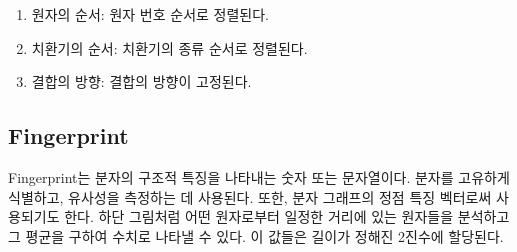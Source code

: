 \documentclass[9pt]{ieeeconf}
\begin{document}
\begin{enumerate}
    \item 원자의 순서: 원자 번호 순서로 정렬된다.
    \item 치환기의 순서: 치환기의 종류 순서로 정렬된다.
    \item 결합의 방향: 결합의 방향이 고정된다.
\end{enumerate}

\subsection[short]{\large {Fingerprint}}
Fingerprint는 분자의 구조적 특징을 나타내는 숫자 또는 문자열이다. 분자를 고유하게 식별하고, 유사성을 측정하는 데 사용된다. 또한, 분자 그래프의 정점 특징 벡터로써 사용되기도 한다. 
하단 그림처럼 어떤 원자로부터 일정한 거리에 있는 원자들을 분석하고 그 평균을 구하여 수치로 나타낼 수 있다. 
이 값들은 길이가 정해진 2진수에 할당된다.
 


\end{document}
